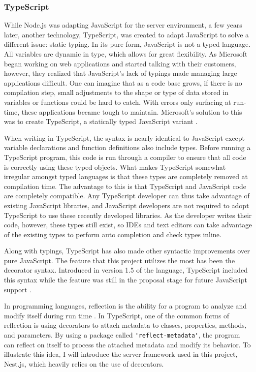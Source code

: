 \subsubsection{TypeScript} \label{sec:typescript}
While Node.js was adapting JavaScript for the server environment, a few years later, another technology, TypeScript, was created to adapt JavaScript to solve a different issue: static typing.  In its pure form, JavaScript is not a typed language.  All variables are dynamic in type, which allows for great flexibility.  As Microsoft began working on web applications and started talking with their customers, however, they realized that JavaScript's lack of typings made managing large applications difficult.  One can imagine that as a code base grows, if there is no compilation step, small adjustments to the shape or type of data stored in variables or functions could be hard to catch.  With errors only surfacing at run-time, these applications became tough to maintain.  Microsoft's solution to this was to create TypeScript, a statically typed JavaScript variant \cite{idgnewsservicestaffMicrosoftAugmentsJavaScript2012}.

When writing in TypeScript, the syntax is nearly identical to JavaScript except variable declarations and function definitions also include types.  Before running a TypeScript program, this code is run through a compiler to ensure that all code is correctly using these typed objects. What makes TypeScript somewhat irregular amongst typed languages is that these types are completely removed at compilation time. The advantage to this is that TypeScript and JavaScript code are completely compatible.  Any TypeScript developer can thus take advantage of existing JavaScript libraries, and JavaScript developers are not required to adopt TypeScript to use these recently developed libraries.  As the developer writes their code, however, these types still exist, so IDEs and text editors can take advantage of the existing types to perform auto completion and check types inline.

Along with typings, TypeScript has also made other syntactic improvements over pure JavaScript.  The feature that this project utilizes the most has been the decorator syntax.  Introduced in version 1.5 of the language, TypeScript included this syntax while the feature was still in the proposal stage for future JavaScript support \cite{turnerAnnouncingTypeScript2015}.

In programming languages, reflection is the ability for a program to analyze and modify itself during run time \cite{malenfantTutorialBehavioralReflection1996}.  In TypeScript, one of the common forms of reflection is using decorators to attach metadata to classes, properties, methods, and parameters.  By using a package called \Verb!'reflect-metadata'!, the program can reflect on itself to process the attached metadata and modify its behavior.  To illustrate this idea, I will introduce the server framework used in this project, Nest.js, which heavily relies on the use of decorators.

